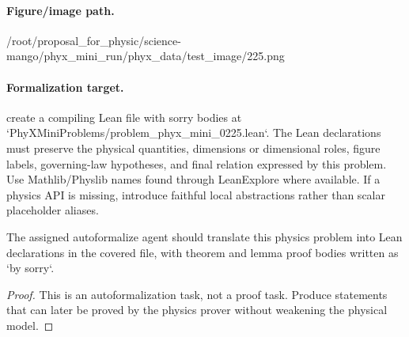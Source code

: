 \paragraph{Figure/image path.}
/root/proposal\_for\_physic/science-mango/phyx\_mini\_run/phyx\_data/test\_image/225.png

\paragraph{Formalization target.}
create a compiling Lean file with sorry bodies at `PhyXMiniProblems/problem\_phyx\_mini\_0225.lean`. The Lean declarations must preserve the physical quantities, dimensions or dimensional roles, figure labels, governing-law hypotheses, and final relation expressed by this problem.
Use Mathlib/Physlib names found through LeanExplore where available. If a physics API is missing, introduce faithful local abstractions rather than scalar placeholder aliases.

\begin{theorem}
\label{thm:physics:phyx_mini_0225:target}
The assigned autoformalize agent should translate this physics problem into Lean declarations in the covered file, with theorem and lemma proof bodies written as `by sorry`.
\end{theorem}
\begin{proof}
This is an autoformalization task, not a proof task. Produce statements that can later be proved by the physics prover without weakening the physical model.
\end{proof}

